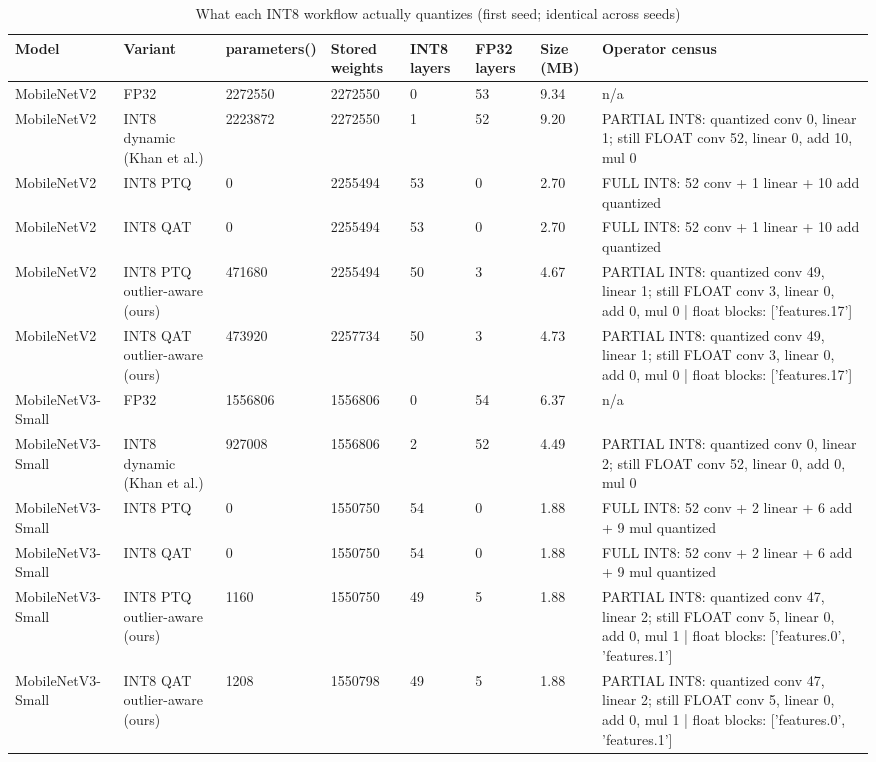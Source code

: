 \begin{table}[t]
\centering
\caption{What each INT8 workflow actually quantizes (first seed; identical across seeds)}
\label{tab:tab03_quantization_accounting}
\small
\begin{tabular}{llllllll}
\toprule
Model & Variant & parameters() & Stored weights & INT8 layers & FP32 layers & Size (MB) & Operator census \\
\midrule
MobileNetV2 & FP32 & 2272550 & 2272550 & 0 & 53 & 9.34 & n/a \\
MobileNetV2 & INT8 dynamic (Khan et al.) & 2223872 & 2272550 & 1 & 52 & 9.20 & PARTIAL INT8: quantized conv 0, linear 1; still FLOAT conv 52, linear 0, add 10, mul 0 \\
MobileNetV2 & INT8 PTQ & 0 & 2255494 & 53 & 0 & 2.70 & FULL INT8: 52 conv + 1 linear + 10 add quantized \\
MobileNetV2 & INT8 QAT & 0 & 2255494 & 53 & 0 & 2.70 & FULL INT8: 52 conv + 1 linear + 10 add quantized \\
MobileNetV2 & INT8 PTQ outlier-aware (ours) & 471680 & 2255494 & 50 & 3 & 4.67 & PARTIAL INT8: quantized conv 49, linear 1; still FLOAT conv 3, linear 0, add 0, mul 0 | float blocks: ['features.17'] \\
MobileNetV2 & INT8 QAT outlier-aware (ours) & 473920 & 2257734 & 50 & 3 & 4.73 & PARTIAL INT8: quantized conv 49, linear 1; still FLOAT conv 3, linear 0, add 0, mul 0 | float blocks: ['features.17'] \\
MobileNetV3-Small & FP32 & 1556806 & 1556806 & 0 & 54 & 6.37 & n/a \\
MobileNetV3-Small & INT8 dynamic (Khan et al.) & 927008 & 1556806 & 2 & 52 & 4.49 & PARTIAL INT8: quantized conv 0, linear 2; still FLOAT conv 52, linear 0, add 0, mul 0 \\
MobileNetV3-Small & INT8 PTQ & 0 & 1550750 & 54 & 0 & 1.88 & FULL INT8: 52 conv + 2 linear + 6 add + 9 mul quantized \\
MobileNetV3-Small & INT8 QAT & 0 & 1550750 & 54 & 0 & 1.88 & FULL INT8: 52 conv + 2 linear + 6 add + 9 mul quantized \\
MobileNetV3-Small & INT8 PTQ outlier-aware (ours) & 1160 & 1550750 & 49 & 5 & 1.88 & PARTIAL INT8: quantized conv 47, linear 2; still FLOAT conv 5, linear 0, add 0, mul 1 | float blocks: ['features.0', 'features.1'] \\
MobileNetV3-Small & INT8 QAT outlier-aware (ours) & 1208 & 1550798 & 49 & 5 & 1.88 & PARTIAL INT8: quantized conv 47, linear 2; still FLOAT conv 5, linear 0, add 0, mul 1 | float blocks: ['features.0', 'features.1'] \\
\bottomrule
\end{tabular}
\end{table}
